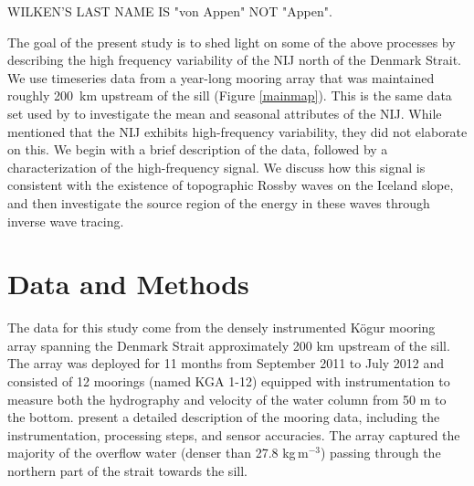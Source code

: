 \documentclass[12pt,titlepage,figuresatend]{article}
\begin{document}
WILKEN'S LAST NAME IS "von Appen" NOT "Appen". 

The goal of the present study is to shed light on some of the above processes by describing the high frequency variability of the NIJ north of the Denmark Strait. We use timeseries data from a year-long mooring array that was maintained roughly 200~km upstream of the sill (Figure \ref{mainmap}). This is the same data set used by \cite{Harden2016} to investigate the mean and seasonal attributes of the NIJ. While \cite{Harden2016} mentioned that the NIJ exhibits high-frequency variability, they did not elaborate on this. We begin with a brief description of the data, followed by a characterization of the high-frequency signal. We discuss how this signal is consistent with the existence of topographic Rossby waves on the Iceland slope, and then investigate the source region of the energy in these waves through inverse wave tracing.


\section{Data and Methods}

The data for this study come from the densely instrumented K\"{o}gur mooring array spanning the Denmark Strait approximately 200 km upstream of the sill. The array was deployed for 11 months from September 2011 to July 2012 and consisted of 12 moorings (named KGA 1-12) equipped with instrumentation to measure both the hydrography and velocity of the water column from 50 m to the bottom. \cite{Harden2016} present a detailed description of the mooring data, including the instrumentation, processing steps, and sensor accuracies. The array captured the majority of the overflow water (denser than 27.8 kg$\,$m$^{-3}$) passing through the northern part of the strait towards the sill.
\end{document}
